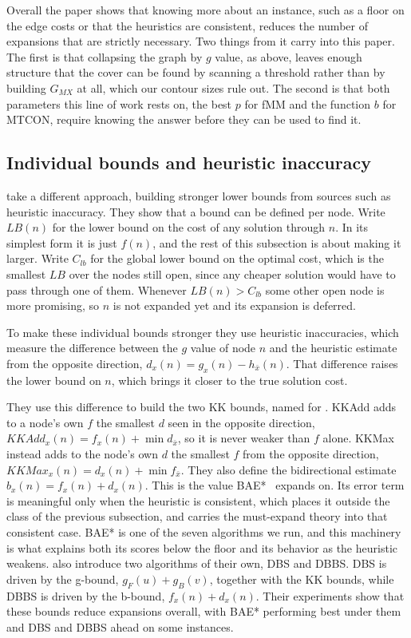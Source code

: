 \documentclass[letterpaper]{article} %
\begin{document}
Overall the paper shows that knowing more about an instance, such as a floor on the edge costs or that the heuristics are consistent, reduces the number of expansions that are strictly necessary. Two things from it carry into this paper. The first is that collapsing the graph by $g$ value, as above, leaves enough structure that the cover can be found by scanning a threshold rather than by building $G_{MX}$ at all, which our contour sizes rule out. The second is that both parameters this line of work rests on, the best $p$ for fMM and the function $b$ for MTCON, require knowing the answer before they can be used to find it.

\subsection{Individual bounds and heuristic inaccuracy}
\citet{alcazar2020unifying} take a different approach, building stronger lower bounds from sources such as heuristic inaccuracy. They show that a bound can be defined per node. Write $LB(n)$ for the lower bound on the cost of any solution through $n$. In its simplest form it is just $f(n)$, and the rest of this subsection is about making it larger. Write $C_{lb}$ for the global lower bound on the optimal cost, which is the smallest $LB$ over the nodes still open, since any cheaper solution would have to pass through one of them. Whenever $LB(n) > C_{lb}$ some other open node is more promising, so $n$ is not expanded yet and its expansion is deferred.

To make these individual bounds stronger they use heuristic inaccuracies, which measure the difference between the $g$ value of node $n$ and the heuristic estimate from the opposite direction, $d_x(n) = g_x(n) - h_{\bar{x}}(n)$. That difference raises the lower bound on $n$, which brings it closer to the true solution cost.

They use this difference to build the two KK bounds, named for \citet{kaindl1997reconsidered}. KKAdd adds to a node's own $f$ the smallest $d$ seen in the opposite direction, $KKAdd_x(n) = f_x(n) + \min d_{\bar{x}}$, so it is never weaker than $f$ alone. KKMax instead adds to the node's own $d$ the smallest $f$ from the opposite direction, $KKMax_x(n) = d_x(n) + \min f_{\bar{x}}$. They also define the bidirectional estimate $b_x(n) = f_x(n) + d_x(n)$. This is the value BAE*~\cite{sadhukhan2013bae} expands on. Its error term is meaningful only when the heuristic is consistent, which places it outside the class of the previous subsection, and \citet{alcazar2021consistent} carries the must-expand theory into that consistent case. BAE* is one of the seven algorithms we run, and this machinery is what explains both its scores below the floor and its behavior as the heuristic weakens. \citet{alcazar2020unifying} also introduce two algorithms of their own, DBS and DBBS. DBS is driven by the g-bound, $g_F(u) + g_B(v)$, together with the KK bounds, while DBBS is driven by the b-bound, $f_x(n) + d_x(n)$. Their experiments show that these bounds reduce expansions overall, with BAE* performing best under them and DBS and DBBS ahead on some instances.
\end{document}
